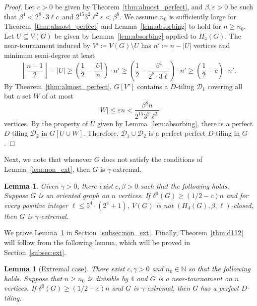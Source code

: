 \documentclass[11pt]{amsart}
\newtheorem{lemma}[theorem]{Lemma}
\def\N{\mathbb{N}}
\newcommand{\D}{\mathcal{D}}
\newcommand{\veps}{\varepsilon}
\begin{document}
\begin{proof}
    Let $c>0$ be given by Theorem~\ref{thm:almost_perfect}, and $\beta, \veps>0$ be such that $\beta^4 < 2^{8} \cdot 3 \ell  c \,$ and $2^{15} 3^2 \ell^2 \veps < \beta^{8}$. We assume $n_0$ is sufficiently large for Theorem~\ref{thm:almost_perfect} and Lemma~\ref{lem:absorbing} to hold for $n\ge n_0$.
    Let $U \subseteq V(G)$ be given by Lemma~\ref{lem:absorbing} applied to $H_4(G)$. The near-tournament induced by $V' \coloneqq V(G)\setminus U$ has $n' \coloneqq n-|U|$ vertices and minimum semi-degree at least 
    $$ \left\lfloor \frac{n-1}{2} \right\rfloor - |U| \ge
    \left( \frac{1}{2} - \frac{|U|}{n} \right) \cdot n' \ge
    \left( \frac{1}{2} - \frac{\beta^4}{2^{8} \cdot 3 \ell } \right) \cdot n' \ge
    \left( \frac{1}{2} - c \right) \cdot n'. $$
    By Theorem~\ref{thm:almost_perfect}, $G[V']$ contains a $D$-tiling $\D _1$ covering all but a set $W$ of at most 
    $$|W| \le \veps n < \frac{\beta^{8}n}{2^{15} 3^2 \ell^2}$$
    vertices. By the property of $U$ given by Lemma~\ref{lem:absorbing}, there is a perfect $D$-tiling $\D_2$ in $G[U \cup W]$. Therefore, $\D_1 \cup \D_2$ is a perfect perfect $D$-tiling in $G$.
\end{proof}

Next, we note that whenever $G$ does not satisfy the conditions of Lemma~\ref{lem:non_ext}, then $G$ is $\gamma$-extremal.

\begin{lemma}\label{lem:notclosedtoextremal}
    Given $\gamma >0$, there exist $c, \beta>0$ such that the following holds. 
    Suppose $G$ is an oriented graph on $n$ vertices.
    If $\delta^0(G)\ge(1/2-c)n$ and for every positive integer $\ell \le 5^{4}\cdot (2^{4}+1)$, $V(G)$ is not $(H_4(G),\beta,\ell)$-closed, then $G$ is $\gamma$-extremal.
\end{lemma}

We prove Lemma~\ref{lem:notclosedtoextremal} in Section~\ref{subsec:non_ext}.
Finally, Theorem~\ref{thm:d112} will follow from the following lemma, which will be proved in Section~\ref{subsec:ext}.

\begin{lemma}[Extremal case] \label{lem:extremal}
    There exist $c, \gamma >0$ and $n_0\in \N$ so that the following holds. Suppose that $n\ge n_0$ is divisible by $4$ and $G$ is a near-tournament on $n$ vertices. 
    If $\delta^0(G)\ge (1/2-c)n$ and $G$ is $\gamma$-extremal, then $G$ has a perfect $D$-tiling.
\end{lemma}
\end{document}
